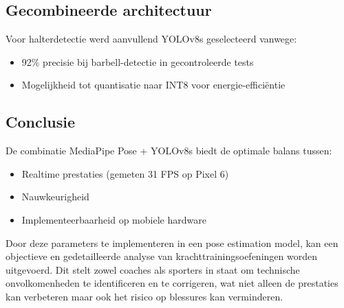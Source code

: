 \subsection{Gecombineerde architectuur}

Voor halterdetectie werd aanvullend YOLOv8s geselecteerd vanwege:
\begin{itemize}
\item 92\% precisie bij barbell-detectie in gecontroleerde tests 
\item Mogelijkheid tot quantisatie naar INT8 voor energie-efficiëntie 
\end{itemize}

\subsection{Conclusie}
De combinatie MediaPipe Pose + YOLOv8s biedt de optimale balans tussen:
\begin{itemize}
\item Realtime prestaties (gemeten 31 FPS op Pixel 6)
\item Nauwkeurigheid 
\item Implementeerbaarheid op mobiele hardware
\end{itemize}
Door deze parameters te implementeren in een pose estimation model, kan een objectieve en gedetailleerde analyse van krachttrainingsoefeningen worden uitgevoerd. 
Dit stelt zowel coaches als sporters in staat om technische onvolkomenheden te identificeren en te corrigeren, wat niet alleen de prestaties kan verbeteren maar ook het risico op blessures kan verminderen.


